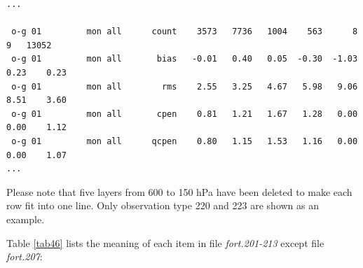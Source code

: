 \begin{scriptsize}
\begin{verbatim}
...
 
 o-g 01         mon all      count    3573   7736   1004    563      8      9   13052
 o-g 01         mon all       bias   -0.01   0.40   0.05  -0.30  -1.03   0.23    0.23
 o-g 01         mon all        rms    2.55   3.25   4.67   5.98   9.06   8.51    3.60
 o-g 01         mon all       cpen    0.81   1.21   1.67   1.28   0.00   0.00    1.12
 o-g 01         mon all      qcpen    0.80   1.15   1.53   1.16   0.00   0.00    1.07
...
\end{verbatim}
\end{scriptsize}

Please note that five layers from 600 to 150 hPa have been deleted to make each row fit into one line. Only observation type 220 and 223 are shown as an example.

Table \ref{tab46} lists the meaning of each item in file \textit{fort.201-213} except file \textit{fort.207}:

